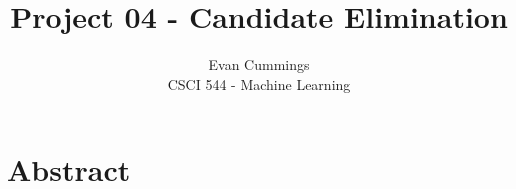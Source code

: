 
\DeclareMathOperator*{\argmax}{arg\,max}

\usepackage[top=.5in, bottom=.5in, left=.5in, right=.5in]{geometry}
\usepackage{natbib}


\small

\title{Project 04 - Candidate Elimination}
\author{Evan Cummings\\
CSCI 544 - Machine Learning}

\maketitle

\section*{Abstract}







